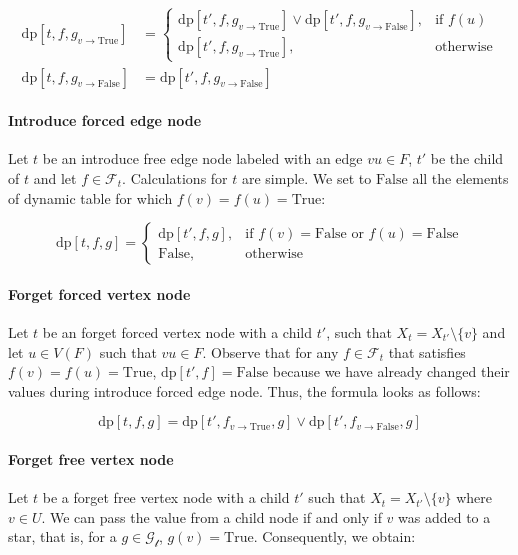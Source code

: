 \documentclass[en]{pracamgr}
\theoremstyle{definition}
\newcommand{\dpt}[1]{\textrm{dp}[#1]}
\newcommand{\true}{\textrm{True}}
\newcommand{\false}{\textrm{False}}
\begin{document}
\begin{equation*}
\begin{split}
	\dpt{t,f,g_{v \rightarrow \true}} & = 
		\begin{cases}
			\dpt{t',f,g_{v \rightarrow \true}} \lor \dpt{t',f,g_{v \rightarrow \false}}, & \text{if $f(u)$} \\
			\dpt{t',f,g_{v \rightarrow \true}}, & \text{otherwise}
		\end{cases}	
	\\
	\dpt{t,f,g_{v \rightarrow \false}} & = \dpt{t',f,g_{v \rightarrow \false}}\end{split}
\end{equation*}

\paragraph{Introduce forced edge node} Let $t$ be an introduce free edge node labeled with an edge $vu \in F$, $t'$ be the child of $t$ and let $f \in \mathcal{F}_t$. Calculations for $t$ are simple. We set to $\false$ all the elements of dynamic table for which $f(v)=f(u)=\true$:

\begin{equation*}
	\dpt{t,f,g} =
	\begin{cases}
		\dpt{t',f,g}, & \text{if $f(v)=\false$ or $f(u)=\false$} \\
		\false, & \text{otherwise}
	\end{cases}
\end{equation*}

\paragraph{Forget forced vertex node} Let $t$ be an forget forced vertex node with a child $t'$, such that $X_t = X_{t'} \setminus \{v\}$ and let $u \in V(F)$ such that $vu \in F$. Observe that for any $f \in \mathcal{F}_t$ that satisfies $f(v)=f(u)=\true$, $\dpt{t',f} = \false$ because we have already changed their values during introduce forced edge node. Thus, the formula looks as follows:

\begin{equation*}
	\dpt{t,f,g} = \dpt{t',f_{v \rightarrow \true},g} \lor \dpt{t',f_{v \rightarrow \false},g}
\end{equation*}

\paragraph{Forget free vertex node} Let $t$ be a forget free vertex node with a child $t'$ such that $X_t = X_{t'} \setminus \{v\}$ where $v \in U$. We can pass the value from a child node if and only if $v$ was added to a star, that is, for a $g \in \mathcal{G_t}$, $g(v)=\true$. Consequently, we obtain:
\end{document}
